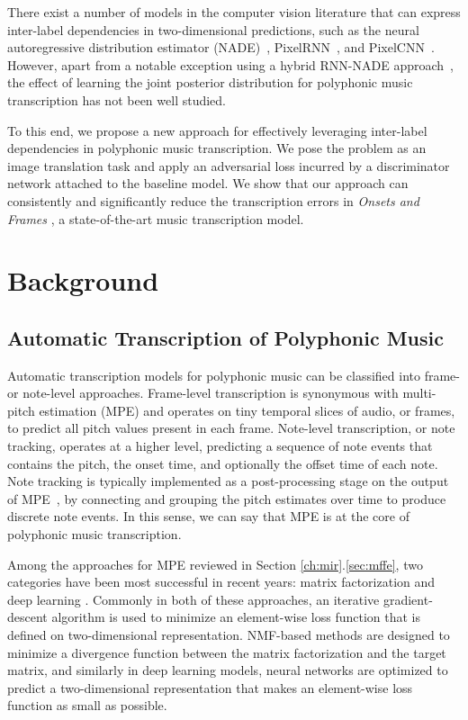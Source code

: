 There exist a number of models in the computer vision literature that can express inter-label dependencies in two-dimensional predictions, such as the neural autoregressive distribution estimator (NADE)~\cite{larochelle2011nade}, PixelRNN~\cite{oord2016pixelrnn}, and PixelCNN~\cite{oord2016pixelcnn}.
However, apart from a notable exception using a hybrid RNN-NADE approach~\cite{boulangerlewandowski2012temporal}, the effect of learning the joint posterior distribution for polyphonic music transcription has not been well studied.


To this end, we propose a new approach for effectively leveraging inter-label dependencies in polyphonic music transcription. We pose the problem as an image translation task and apply an adversarial loss incurred by a discriminator network attached to the baseline model.
We show that our approach can consistently and significantly reduce the transcription errors in \emph{Onsets and Frames} \cite{hawthorne2018onsetsframes}, a state-of-the-art music transcription model.


\section{Background}

\subsection{Automatic Transcription of Polyphonic Music}

Automatic transcription models for polyphonic music can be classified into frame- or note-level approaches.
Frame-level transcription is synonymous with multi-pitch estimation (MPE) and operates on tiny temporal slices of audio, or frames, to predict all pitch values present in each frame.
Note-level transcription, or note tracking, operates at a higher level, predicting a sequence of note events that contains the pitch, the onset time, and optionally the offset time of each note.
Note tracking is typically implemented as a post-processing stage on the output of MPE~\cite{benetos2019amt}, by connecting and grouping the pitch estimates over time to produce discrete note events.
In this sense, we can say that MPE is at the core of polyphonic music transcription.

Among the approaches for MPE reviewed in Section \ref{ch:mir}.\ref{sec:mffe}, two categories have been most successful in recent years: matrix factorization \cite{lee2001nmf} and deep learning \cite{lecun2015deeplearning}.
Commonly in both of these approaches, an iterative gradient-descent algorithm is used to minimize an element-wise loss function that is defined on two-dimensional representation.
NMF-based methods are designed to minimize a divergence function between the matrix factorization and the target matrix, and similarly in deep learning models, neural networks are optimized to predict a two-dimensional representation that makes an element-wise loss function as small as possible.


